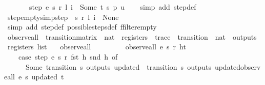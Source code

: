 \begin{isabellebody}
\ \ \ \ \ \ \ step\ e\ s\ r\ l\ i\ {\isacharequal}\ Some\ {\isacharparenleft}t{\isacharcomma}\ s{\isacharprime}{\isacharcomma}\ p{\isacharcomma}\ u{\isacharparenright}{\isachardoublequoteclose}\isanewline
%
\isadelimproof
\ \ %
\endisadelimproof
%
\isatagproof
{}\isamarkupfalse%
\ {\isacharparenleft}simp\ add{\isacharcolon}\ step{\isacharunderscore}def{\isacharparenright}%
\endisatagproof
{\isafoldproof}%
%
\isadelimproof
\isanewline
%
\endisadelimproof
\isanewline
{}\isamarkupfalse%
\ step{\isacharunderscore}empty{\isacharbrackleft}simp{\isacharbrackright}{\isacharcolon}{\isachardoublequoteopen}step\ {\isacharbraceleft}{\isacharbar}{\isacharbar}{\isacharbraceright}\ s\ r\ l\ i\ {\isacharequal}\ None{\isachardoublequoteclose}\isanewline
%
\isadelimproof
\ \ %
\endisadelimproof
%
\isatagproof
{}\isamarkupfalse%
\ {\isacharparenleft}simp\ add{\isacharcolon}\ step{\isacharunderscore}def\ possible{\isacharunderscore}steps{\isacharunderscore}def\ ffilter{\isacharunderscore}empty{\isacharparenright}%
\endisatagproof
{\isafoldproof}%
%
\isadelimproof
\isanewline
%
\endisadelimproof
\isanewline
{}\isamarkupfalse%
\ observe{\isacharunderscore}all\ {\isacharcolon}{\isacharcolon}\ {\isachardoublequoteopen}transition{\isacharunderscore}matrix\ {\isasymRightarrow}\ nat\ {\isasymRightarrow}\ registers\ {\isasymRightarrow}\ trace\ {\isasymRightarrow}\ {\isacharparenleft}transition\ {\isasymtimes}\ nat\ {\isasymtimes}\ outputs\ {\isasymtimes}\ registers{\isacharparenright}\ list{\isachardoublequoteclose}\ \isanewline
\ \ {\isachardoublequoteopen}observe{\isacharunderscore}all\ {\isacharunderscore}\ {\isacharunderscore}\ {\isacharunderscore}\ {\isacharbrackleft}{\isacharbrackright}\ {\isacharequal}\ {\isacharbrackleft}{\isacharbrackright}{\isachardoublequoteclose}\ {\isacharbar}\isanewline
\ \ {\isachardoublequoteopen}observe{\isacharunderscore}all\ e\ s\ r\ {\isacharparenleft}h{\isacharhash}t{\isacharparenright}\ {\isacharequal}\isanewline
\ \ \ \ {\isacharparenleft}case\ {\isacharparenleft}step\ e\ s\ r\ {\isacharparenleft}fst\ h{\isacharparenright}\ {\isacharparenleft}snd\ h{\isacharparenright}{\isacharparenright}\ of\isanewline
\ \ \ \ \ \ {\isacharparenleft}Some\ {\isacharparenleft}transition{\isacharcomma}\ s{\isacharprime}{\isacharcomma}\ outputs{\isacharcomma}\ updated{\isacharparenright}{\isacharparenright}\ {\isasymRightarrow}\ {\isacharparenleft}{\isacharparenleft}{\isacharparenleft}transition{\isacharcomma}\ s{\isacharprime}{\isacharcomma}\ outputs{\isacharcomma}\ updated{\isacharparenright}{\isacharhash}{\isacharparenleft}observe{\isacharunderscore}all\ e\ s{\isacharprime}\ updated\ t{\isacharparenright}{\isacharparenright}{\isacharparenright}\ {\isacharbar}\isanewline

\end{isabellebody}
